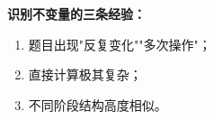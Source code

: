 \begin{ideaBox}
\textbf{识别不变量的三条经验：}

\begin{enumerate}
  \item 题目出现"反复变化""多次操作"；
  \item 直接计算极其复杂；
  \item 不同阶段结构高度相似。
\end{enumerate}
\end{ideaBox}